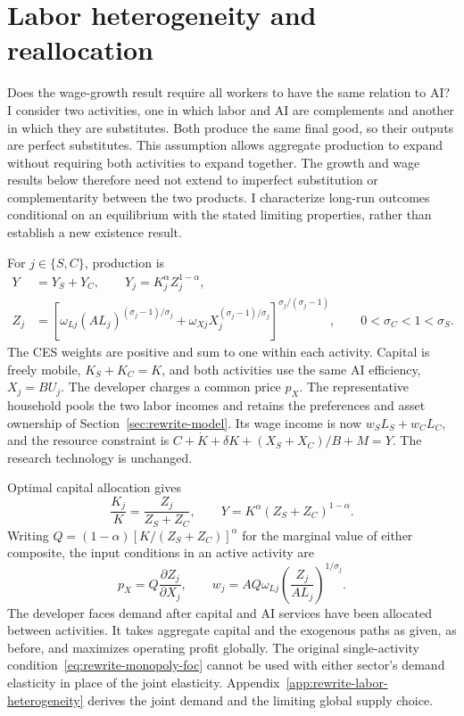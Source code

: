 \section{Labor heterogeneity and reallocation}
\label{sec:rewrite-labor-heterogeneity}

Does the wage-growth result require all workers to have the same relation
to AI? I consider two activities, one in which labor and AI are complements
and another in which they are substitutes. Both produce the same final good,
so their outputs are perfect substitutes. This assumption allows aggregate
production to expand without requiring both activities to expand together.
The growth and wage results below therefore need not extend to imperfect
substitution or complementarity between the two products.
I characterize long-run outcomes conditional on an equilibrium with the
stated limiting properties, rather than establish a new existence result.

For $j\in\{S,C\}$, production is
\begin{align}
 Y&=Y_S+Y_C,\qquad Y_j=K_j^\alpha Z_j^{1-\alpha},
 \label{eq:rewrite-heterogeneous-output}\\
 Z_j&=\left[\omega_{Lj}(AL_j)^{(\sigma_j-1)/\sigma_j}
 +\omega_{Xj}X_j^{(\sigma_j-1)/\sigma_j}\right]^{\sigma_j/(\sigma_j-1)},
 \qquad 0<\sigma_C<1<\sigma_S.
 \label{eq:rewrite-heterogeneous-ces}
\end{align}
The CES weights are positive and sum to one within each activity.
Capital is freely mobile, $K_S+K_C=K$, and both activities use the same
AI efficiency, $X_j=BU_j$. The developer charges a common price $p_X$.
The representative household pools the two labor incomes and retains the
preferences and asset ownership of Section~\ref{sec:rewrite-model}.
Its wage income is now $w_SL_S+w_CL_C$, and the resource constraint is
$C+\dot K+\delta K+(X_S+X_C)/B+M=Y$.
The research technology is unchanged.

Optimal capital allocation gives
\begin{equation}
 \frac{K_j}{K}=\frac{Z_j}{Z_S+Z_C},\qquad
 Y=K^\alpha(Z_S+Z_C)^{1-\alpha}.
 \label{eq:rewrite-heterogeneous-capital}
\end{equation}
Writing $Q=(1-\alpha)[K/(Z_S+Z_C)]^\alpha$ for the marginal value of
either composite, the input conditions in an active activity are
\begin{equation}
 p_X=Q\frac{\partial Z_j}{\partial X_j},\qquad
 w_j=AQ\omega_{Lj}\left(\frac{Z_j}{AL_j}\right)^{1/\sigma_j}.
 \label{eq:rewrite-heterogeneous-prices}
\end{equation}
The developer faces demand after capital and AI services have been allocated
between activities. It takes aggregate capital and the exogenous paths as
given, as before, and maximizes operating profit globally. The original
single-activity condition~\eqref{eq:rewrite-monopoly-foc} cannot be used
with either sector's demand elasticity in place of the joint elasticity.
Appendix~\ref{app:rewrite-labor-heterogeneity} derives the joint demand
and the limiting global supply choice.

